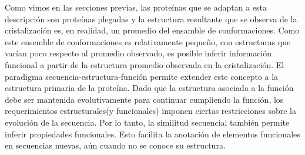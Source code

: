Como vimos en las secciones previas, las proteínas que se adaptan a esta descripción son proteínas plegadas y la estructura resultante que se observa de la cristalización es, en realidad, un promedio del ensamble de conformaciones.
Como este ensemble de conformaciones es relativamente pequeño, con estructuras que varían poco respecto al promedio observado, es posible inferir información funcional a partir de la estructura promedio observada en la cristalización.
El paradigma secuencia-estructura-función permite extender este concepto a la estructura primaria de la proteína.
Dado que la estructura asociada a la función debe ser mantenida evolutivamente para continuar cumpliendo la función, los requerimientos estructurales(y funcionales) imponen ciertas restricciones sobre la evolución de la secuencia.
Por lo tanto, la similitud secuencial también permite inferir propiedades funcionales. Esto facilita la anotación de elementos funcionales en secuencias nuevas, aún cuando no se conoce su estructura.









